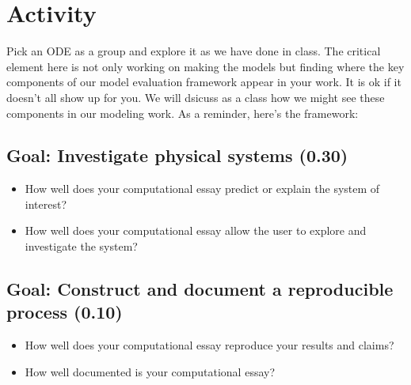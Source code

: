 \documentclass[letterpaper,10pt,english]{jupyterBook}
\begin{document}
\section{Activity}
\label{\detokenize{content/1_mechanics/ODE_games:activity}}
\sphinxAtStartPar
Pick an ODE as a group and explore it as we have done in class. The critical element here is not only working on making the models but finding where the key components of our model evaluation framework appear in your work. It is ok if it doesn’t all show up for you. We will dsicuss as a class how we might see these components in our modeling work. As a reminder, here’s the framework:


\subsection{Goal: Investigate physical systems (0.30)}
\label{\detokenize{content/1_mechanics/ODE_games:goal-investigate-physical-systems-0-30}}\begin{itemize}
\item {} 
\sphinxAtStartPar
How well does your computational essay predict or explain the system of interest?

\item {} 
\sphinxAtStartPar
How well does your computational essay allow the user to explore and investigate the system?

\end{itemize}


\subsection{Goal: Construct and document a reproducible process (0.10)}
\label{\detokenize{content/1_mechanics/ODE_games:goal-construct-and-document-a-reproducible-process-0-10}}\begin{itemize}
\item {} 
\sphinxAtStartPar
How well does your computational essay reproduce your results and claims?

\item {} 
\sphinxAtStartPar
How  well documented is your computational essay?

\end{itemize}
\end{document}
